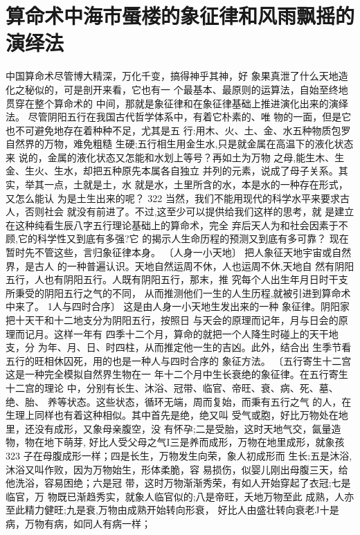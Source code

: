 \section{算命术中海市蜃楼的象征律和风雨飘摇的演绎法}
中国算命术尽管博大精深，万化千变，搞得神乎其神，好
象果真泄了什么天地造化之秘似的，可是剖开来看，它也有一
个最基本、最原则的运算法，自始至终地贯穿在整个算命术的
中间，那就是象征律和在象征律基础上推进演化出来的演绎
法。
尽管阴阳五行在我国古代哲学体系中，有着它朴素的、唯
物的一面，但是它也不可避免地存在着种种不足，尤其是五
行:用木、火、土、金、水五种物质包罗自然界的万物，难免粗糙
生硬;五行相生用金生水,只是就金属在高温下的液化状态来
说的，金属的液化状态又怎能和水划上等号？再如土为万物
之母,能生木、生金、生火、生水，却把五种原先本属各自独立
并列的元素，说成了母子关系。其实，举其一点，土就是土，水
就是水，土里所含的水，本是水的一种存在形式，又怎么能认
为是土生出来的呢？
 322 
当然，我们不能用现代的科学水平来要求古人，否则社会
就没有前进了。不过,这至少可以提供给我们这样的思考，就
是建立在这种纯看生辰八字五行理论基础上的算命术，完全
弃后天人为和社会因素于不顾,它的科学性又到底有多强?它
的揭示人生命历程的预测又到底有多可靠？
现在暂时先不管这些，言归象征律本身。
〔人身一小天地〕 把人象征天地宇宙或自然界，是古人
的一种普遍认识。天地自然运周不休，人也运周不休,天地自
然有阴阳五行，人也有阴阳五行。人既有阴阳五行，那末，推
究每个人出生年月日时干支所秉受的阴阳五行之气的不同，
从而推测他们一生的人生历程,就被引进到算命术中来了。
1人与四时合序〕 这是由人身一小天地生发出来的一种
象征律。阴阳家把十天干和十二地支分为阴阳五行，按照日
与天会的原理而记年，月与日会的原理而记月。这样一年有
四季十二个月，算命的就把一个人降生时碰上的天干地支，分
为年、月、日、时四柱，从而推定他一生的吉凶。此外，结合出
生季节看五行的旺相休囚死，用的也是一种人与四时合序的
象征方法。
〔五行寄生十二宫 这是一种完全模拟自然界生物在一
年十二个月中生长衰绝的象征律。在五行寄生十二宫的理论
中，分别有长生、沐浴、冠带、临官、帝旺、衰、病、死、墓、绝、胎、
养等状态。这些状态，循环无端，周而复始，而秉有五行之气
的人，在生理上同样也有着这种相似。其中首先是绝，绝又叫
受气或胞，好比万物处在地里，还没有成形，又象母亲腹空，没
有怀孕;二是受胎，这时天地气交，氤量造物，物在地下萌芽,
好比人受父母之气I三是养而成形，万物在地里成形，就象孩
 323 
子在母腹成形一样；四是长生，万物发生向荣，象人初成形而
生长;五是沐浴,沐浴又叫作败，因为万物始生，形体柔脆，容
易损伤，似婴儿刚出母腹三天，给他洗浴，容易困绝；六是冠
带，这时万物渐渐秀荣，有如人开始穿起了衣冠;七是临官，万
物既已渐趋秀实，就象人临官似的;八是帝旺，夭地万物至此
成熟，人亦至此精力健旺;九是衰,万物由成熟开始转向形衰，
好比人由盛壮转向衰老J十是病，万物有病，如同人有病一样；
